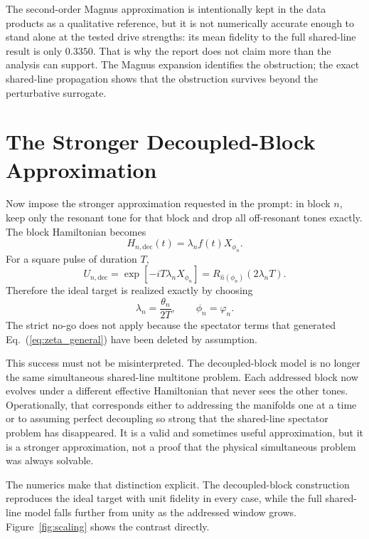 \documentclass[aps,pra,twocolumn,reprint,floatfix,amsmath,amssymb]{revtex4-2}
\begin{document}
The second-order Magnus approximation is intentionally kept in the data products as a qualitative reference, but it is not numerically accurate enough to stand alone at the tested drive strengths: its mean fidelity to the full shared-line result is only \(0.3350\). That is why the report does not claim more than the analysis can support. The Magnus expansion identifies the obstruction; the exact shared-line propagation shows that the obstruction survives beyond the perturbative surrogate.

\section{The Stronger Decoupled-Block Approximation}
\label{sec:decoupled}

Now impose the stronger approximation requested in the prompt: in block \(n\), keep only the resonant tone for that block and drop all off-resonant tones exactly. The block Hamiltonian becomes
\begin{equation}
H_{n,\mathrm{dec}}(t)=\lambda_n f(t) X_{\phi_n}.
\end{equation}
For a square pulse of duration \(T\),
\begin{equation}
U_{n,\mathrm{dec}}
= \exp\!\left[-iT\lambda_n X_{\phi_n}\right]
= R_{\hat n(\phi_n)}(2\lambda_n T).
\end{equation}
Therefore the ideal target is realized exactly by choosing
\begin{equation}
\lambda_n = \frac{\theta_n}{2T},
\qquad
\phi_n = \varphi_n.
\end{equation}
The strict no-go does not apply because the spectator terms that generated Eq.~(\ref{eq:zeta_general}) have been deleted by assumption.

This success must not be misinterpreted. The decoupled-block model is no longer the same simultaneous shared-line multitone problem. Each addressed block now evolves under a different effective Hamiltonian that never sees the other tones. Operationally, that corresponds either to addressing the manifolds one at a time or to assuming perfect decoupling so strong that the shared-line spectator problem has disappeared. It is a valid and sometimes useful approximation, but it is a stronger approximation, not a proof that the physical simultaneous problem was always solvable.

The numerics make that distinction explicit. The decoupled-block construction reproduces the ideal target with unit fidelity in every case, while the full shared-line model falls further from unity as the addressed window grows. Figure~\ref{fig:scaling} shows the contrast directly.
\end{document}
